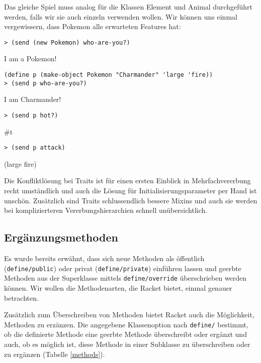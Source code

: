 Das gleiche Spiel muss analog für die Klassen Element und Animal durchgeführt werden, falls wir sie auch einzeln verwenden wollen. Wir können uns einmal vergewissern, dass Pokemon alle erwarteten Features hat:

\begin{lstlisting}
> (send (new Pokemon) who-are-you?)
\end{lstlisting}
{\routput {\qq}I am a Pokemon!\qq}

\begin{lstlisting}
(define p (make-object Pokemon "Charmander" 'large 'fire))
> (send p who-are-you?)
\end{lstlisting}
{\routput {\qq}I am Charmander!\qq}

\begin{lstlisting}
> (send p hot?)
\end{lstlisting}
{\routput \#t}

\begin{lstlisting}
> (send p attack)
\end{lstlisting}
{\rsymbol (large fire)}

Die Konfliktlösung bei Traits ist für einen ersten Einblick in Mehrfachvererbung recht umständlich und auch die Lösung für Initialisierungsparameter per Hand ist unschön. Zusätzlich sind Traits schlussendlich bessere Mixins und auch sie werden bei komplizierteren Vererbungshierarchien schnell unübersichtlich.

\subsection{Ergänzungsmethoden}

Es wurde bereits erwähnt, dass sich neue Methoden als öffentlich (\texttt{define/public}) oder privat (\texttt{define/private}) einführen lassen und geerbte Methoden aus der Superklasse mittels \texttt{define/override} überschrieben werden können. Wir wollen die Methodenarten, die Racket bietet, einmal genauer betrachten. 

Zusätzlich zum Überschreiben von Methoden bietet Racket auch die Möglichkeit, Methoden zu erzänzen. Die angegebene Klassenoption nach \texttt{define/} bestimmt, ob die definierte Methode eine geerbte Methode überschreibt oder ergänzt und auch, ob es möglich ist, diese Methode in einer Subklasse zu überschreiben oder zu ergänzen (Tabelle \ref{methods}).

